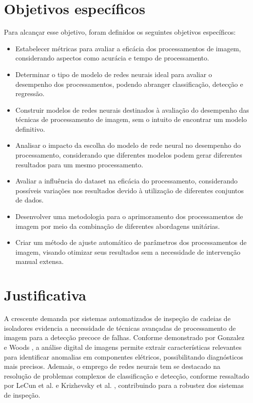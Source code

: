 \section{Objetivos específicos}

Para alcançar esse objetivo, foram definidos os seguintes objetivos específicos:

\begin{itemize}
    \item Estabelecer métricas para avaliar a eficácia dos processamentos de imagem, considerando aspectos como acurácia e tempo de processamento.
    \item Determinar o tipo de modelo de redes neurais ideal para avaliar o desempenho dos processamentos, podendo abranger classificação, detecção e regressão.
    \item Construir modelos de redes neurais destinados à avaliação do desempenho das técnicas de processamento de imagem, sem o intuito de encontrar um modelo definitivo.
    \item Analisar o impacto da escolha do modelo de rede neural no desempenho do processamento, considerando que diferentes modelos podem gerar diferentes resultados para um mesmo processamento.
    \item Avaliar a influência do dataset na eficácia do processamento, considerando possíveis variações nos resultados devido à utilização de diferentes conjuntos de dados.
    \item Desenvolver uma metodologia para o aprimoramento dos processamentos de imagem por meio da combinação de diferentes abordagens unitárias.
    \item Criar um método de ajuste automático de parâmetros dos processamentos de imagem, visando otimizar seus resultados sem a necessidade de intervenção manual extensa.
\end{itemize}

\section{Justificativa}

A crescente demanda por sistemas automatizados de inspeção de cadeias de isoladores evidencia a necessidade de técnicas avançadas de processamento de imagem para a detecção precoce de falhas. Conforme demonstrado por Gonzalez e Woods \cite{Gonzalez2008}, a análise digital de imagens permite extrair características relevantes para identificar anomalias em componentes elétricos, possibilitando diagnósticos mais precisos. Ademais, o emprego de redes neurais tem se destacado na resolução de problemas complexos de classificação e detecção, conforme ressaltado por LeCun et al. \cite{LeCun2015} e Krizhevsky et al. \cite{Krizhevsky2012}, contribuindo para a robustez dos sistemas de inspeção.


